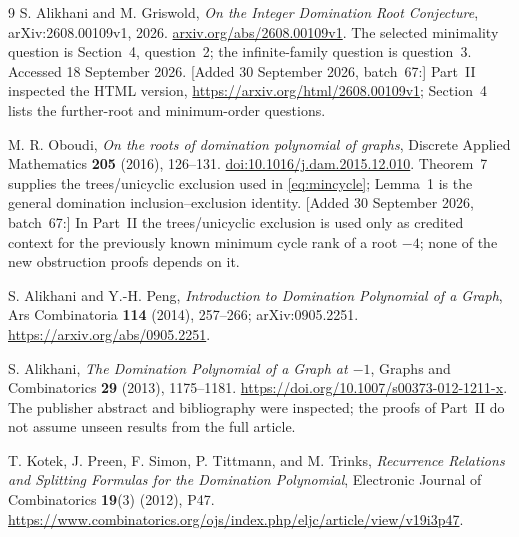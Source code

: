 \documentclass[11pt]{article}
\numberwithin{equation}{section}
\theoremstyle{definition}
\begin{document}
\begin{thebibliography}{9}
S. Alikhani and M. Griswold,
\emph{On the Integer Domination Root Conjecture},
arXiv:2608.00109v1, 2026.
\href{https://arxiv.org/abs/2608.00109v1}{arxiv.org/abs/2608.00109v1}.
The selected minimality question is Section~4, question~2;
the infinite-family question is question~3. Accessed 18 September 2026.
[Added 30 September 2026, batch~67:] Part~II inspected the HTML version,
\url{https://arxiv.org/html/2608.00109v1}; Section~4 lists the
further-root and minimum-order questions.

M. R. Oboudi,
\emph{On the roots of domination polynomial of graphs},
Discrete Applied Mathematics \textbf{205} (2016), 126--131.
\href{https://doi.org/10.1016/j.dam.2015.12.010}{doi:10.1016/j.dam.2015.12.010}.
Theorem~7 supplies the trees/unicyclic exclusion used in
\eqref{eq:mincycle}; Lemma~1 is the general domination
inclusion--exclusion identity.
[Added 30 September 2026, batch~67:] In Part~II the trees/unicyclic
exclusion is used only as credited context for the previously known
minimum cycle rank of a root $-4$; none of the new obstruction proofs
depends on it.

S. Alikhani and Y.-H. Peng,
\emph{Introduction to Domination Polynomial of a Graph},
Ars Combinatoria \textbf{114} (2014), 257--266;
arXiv:0905.2251.
\url{https://arxiv.org/abs/0905.2251}.

S. Alikhani,
\emph{The Domination Polynomial of a Graph at $-1$},
Graphs and Combinatorics \textbf{29} (2013), 1175--1181.
\url{https://doi.org/10.1007/s00373-012-1211-x}.
The publisher abstract and bibliography were inspected; the proofs of
Part~II do not assume unseen results from the full article.

T. Kotek, J. Preen, F. Simon, P. Tittmann, and M. Trinks,
\emph{Recurrence Relations and Splitting Formulas for the Domination Polynomial},
Electronic Journal of Combinatorics \textbf{19}(3) (2012), P47.
\url{https://www.combinatorics.org/ojs/index.php/eljc/article/view/v19i3p47}.
\end{thebibliography}
\end{document}
